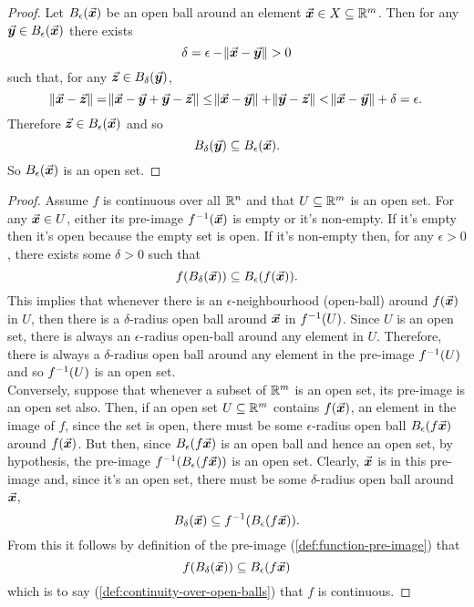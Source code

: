 \documentclass[../MathsNotesBase.tex]{subfiles}
\begin{document}
{		
		
		\biggerskip
		\begin{proof}
			Let ${ B_\epsilon(\vec{\bm{x}}) }$ be an open ball around an element ${ \vec{\bm{x}} \in X \subseteq \mathbb{R}^{m} }$. Then for any ${ \vec{\bm{y}} \in B_\epsilon(\vec{\bm{x}}) }$ there exists
			\[ \delta = \epsilon - \norm{\vec{\bm{x}} - \vec{\bm{y}}} > 0 \]
			such that, for any ${ \vec{\bm{z}} \in B_\delta(\vec{\bm{y}}) }$,
			\[ \norm{\vec{\bm{x}} - \vec{\bm{z}}} = \norm{\vec{\bm{x}} - \vec{\bm{y}} + \vec{\bm{y}} - \vec{\bm{z}}} \leq \norm{\vec{\bm{x}} - \vec{\bm{y}}} + \norm{\vec{\bm{y}} - \vec{\bm{z}}} < \norm{\vec{\bm{x}} - \vec{\bm{y}}} + \delta = \epsilon. \]
			Therefore ${ \vec{\bm{z}} \in B_\epsilon(\vec{\bm{x}}) }$ and so
			\[ B_\delta(\vec{\bm{y}}) \subseteq B_\epsilon(\vec{\bm{x}}). \]
			So ${ B_\epsilon(\vec{\bm{x}}) }$ is an open set.
		\end{proof}
		
		\bigskip
		\begin{proof}
			Assume $f$ is continuous over all $\mathbb{R}^{n}$ and that ${ U \subseteq \mathbb{R}^{m} }$ is an open set. For any ${ \vec{\bm{x}} \in U }$, either its pre-image ${ {f}^{-1}(\vec{\bm{x}}) }$ is empty or it's non-empty. If it's empty then it's open because the empty set is open. If it's non-empty then, for any ${ \epsilon > 0 }$, there exists some ${ \delta > 0 }$ such that
			\[ f(B_\delta(\vec{\bm{x}})) \subseteq B_\epsilon(f(\vec{\bm{x}})). \]
			This implies that whenever there is an $\epsilon$-neighbourhood (open-ball) around $f(\vec{\bm{x}})$ in $U$, then there is a $\delta$-radius open ball around $\vec{\bm{x}}$ in ${f}^{-1}(U)$. Since $U$ is an open set, there is always an $\epsilon$-radius open-ball around any element in $U$. Therefore, there is always a $\delta$-radius open ball around any element in the pre-image ${f}^{-1}(U)$ and so ${f}^{-1}(U)$ is an open set.\\
			
			Conversely, suppose that whenever a subset of $\mathbb{R}^{m}$ is an open set, its pre-image is an open set also. Then, if an open set ${ U \subseteq \mathbb{R}^{m} }$ contains $f(\vec{\bm{x}})$, an element in the image of $f$, since the set is open, there must be some $\epsilon$-radius open ball $B_\epsilon(f\vec{\bm{x}})$ around $f(\vec{\bm{x}})$. But then, since $B_\epsilon(f\vec{\bm{x}})$ is an open ball and hence an open set, by hypothesis, the pre-image ${ {f}^{-1}(B_\epsilon(f\vec{\bm{x}})) }$ is an open set. Clearly, $\vec{\bm{x}}$ is in this pre-image and, since it's an open set, there must be some $\delta$-radius open ball around $\vec{\bm{x}}$,
			\[ B_\delta(\vec{\bm{x}}) \subseteq {f}^{-1}(B_\epsilon(f\vec{\bm{x}})). \]
			From this it follows by definition of the pre-image (\ref{def:function-pre-image}) that
			\[ f(B_\delta(\vec{\bm{x}})) \subseteq B_\epsilon(f\vec{\bm{x}}) \]
			which is to say (\ref{def:continuity-over-open-balls}) that $f$ is continuous.
		\end{proof}
		
}
\end{document}
